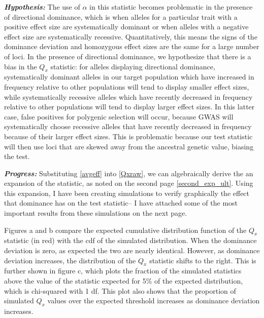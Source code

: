 \documentclass[a4paper,11pt]{article}
\begin{document}
\textbf{\emph{Hypothesis:}} The use of $\alpha$ in this statistic becomes problematic in the
presence of directional dominance, which is when alleles for a
particular trait with a positive effect size are systematically
dominant or when alleles with a negative effect size are
systematically recessive. Quantitatively, this means the signs of the
dominance deviation and homozygous effect sizes are the same for a
large number of loci. In the presence of directional dominance, we
hypothesize that there is a bias in the $Q_x$ statistic: for alleles
displaying directional dominance, systematically dominant alleles in
our target population which have increased in frequency relative to
other populations  will tend to display smaller effect sizes, while
systematically recessive alleles which have recently decreased in
frequency relative to other populations will tend to display larger
effect sizes. In this latter case, false positives for polygenic
selection will occur, because GWAS will systematically choose
recessive alleles that have recently decreased in frequency because of
their larger effect sizes. This is problematic because our test
statistic will then use loci that are
skewed away from the ancestral genetic value, biasing the test.

\textbf{\emph{Progress:}} Substituting \eqref{avgeff} into \eqref{Qxraw}, we can
algebraically derive the an expansion of the statistic, as noted on
the second page \eqref{second_exp_ult}. Using this
expansion, I have been creating simulations to verify graphically the
effect that dominance has on the test statistic-- I have attached some
of the most important results from these simulations on the next page.

Figures a and b compare the expected cumulative distribution
function of the $Q_x$ statistic (in red) with the cdf of the simulated
distribution. When the dominance deviation is zero, as expected the
two are nearly identical. However, as dominance deviation increases,
the distribution of the $Q_x$ statistic shifts to
the right. This is further shown in figure c, which plots the fraction
of the simulated statistics above the value of the statistic expected
for 5\% of the expected distribution, which is chi-squared with 1
df. This plot also shows that the proportion of simulated $Q_x$ values
over the expected threshold increases as dominance deviation increases.
\end{document}
